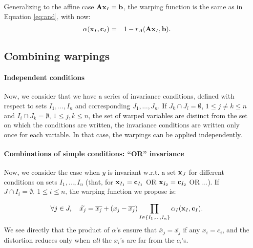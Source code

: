 Generalizing to the affine case $\mathbf{A} \mathbf{x}_I = \mathbf{b}$, 
% 
the warping function is the same as in Equation \ref{eq:and}, with now:
\begin{eqnarray}
  \alpha(\mathbf{x}_I,  \mathbf{c}_I) &=& 1 - r_A(\mathbf{A} \mathbf{x}_I, \mathbf{b}).\label{eq:aff}
\end{eqnarray}

\subsection{Combining warpings}

\paragraph{Independent conditions}
Now, we consider that we have a series of invariance conditions, defined with respect to sets $I_1, \ldots, I_n$ and corresponding $J_1, \ldots, J_n$.
If $J_k\cap J_l=\emptyset$, $1 \leq j\neq k \leq n$ and $I_i\cap J_k = \emptyset$,  $1 \leq j,k \leq n$,
the set of warped variables are distinct from the set on which the conditions are written, 
the invariance conditions are written only once for each variable. In that case, 
the warpings can be applied independently.

\paragraph{Combinations of simple conditions: ``OR'' invariance}
Now, we consider the case when $y$ is invariant w.r.t. a set $\mathbf{x}_J$ for different conditions on sets $I_1, \ldots, I_n$
(that, for $\mathbf{x}_{I_1}=\mathbf{c}_{I_1}$ OR $\mathbf{x}_{I_2}=\mathbf{c}_{I_2}$ OR $\ldots$).
If $J\cap I_i=\emptyset$, $1 \leq i \leq n$, the warping function we propose is:

\begin{equation}
 \forall j \in J, \quad \widetilde{x_j} = \overline{x_j} + \left( x_j - \overline{x_j}\right) \prod_{I \in \{I_1, \ldots, I_n \}}{\alpha_I}(\x_I, \cc_I)\label{eq:or0}. %
\end{equation}
% 
We see directly that the product of $\alpha$'s ensure that $\widetilde{x_j} = \overline{x_j}$
if any $x_i = c_i$, and the distortion reduces only when \emph{all} the $x_i$'s are far from the $c_i$'s.

